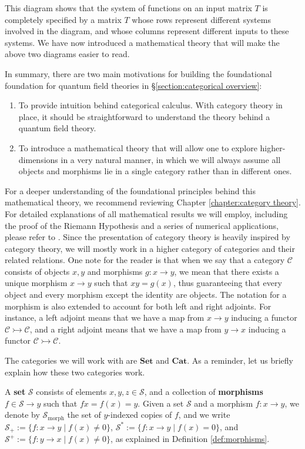 \documentclass[a4paper,reqno,oneside]{article}
\begin{document}
This diagram shows that the system of functions on an input matrix $T$ is completely specified by a matrix $T$ whose rows represent different systems involved in the diagram, and whose columns represent different inputs to these systems. We have now introduced a mathematical theory that will make the above two diagrams easier to read.

In summary, there are two main motivations for building the foundational foundation for quantum field theories in \S \ref{section:categorical overview}: 
\begin{enumerate}
    \item To provide intuition behind categorical calculus. With category theory in place, it should be straightforward to understand the theory behind a quantum field theory.  
    \item To introduce a mathematical theory that will allow one to explore higher-dimensions in a very natural manner, in which we will always assume all objects and morphisms lie in a single category rather than in different ones.
\end{enumerate} 
For a deeper understanding of the foundational principles behind this mathematical theory, we recommend reviewing Chapter \ref{chapter:category theory}. For detailed explanations of all mathematical results we will employ, including the proof of the Riemann Hypothesis and a series of numerical applications, please refer to \cite{MaxVazquez:2023}. Since the presentation of category theory is heavily inspired by category theory, we will mostly work in a higher category of categories and their related relations. One note for the reader is that when we say that a category $\mathcal{C}$ consists of objects $x, y$ and morphisms $g: x \to y$, we mean that there exists a unique morphism $x \to y$ such that $xy = g(x)$, thus guaranteeing that every object and every morphism except the identity are objects. The notation for a morphism is also extended to account for both left and right adjoints. For instance, a left adjoint means that we have a map from $x \to y$ inducing a functor $\mathcal{C} \rightarrowtail \mathcal{C}$, and a right adjoint means that we have a map from $y \to x$ inducing a functor $\mathcal{C} \rightarrowtail \mathcal{C}$. 

The categories we will work with are $\mathbf{Set}$ and $\mathbf{Cat}$. As a reminder, let us briefly explain how these two categories work. 
\begin{definition}[Set]
    A \textbf{set} $\mathcal{S}$ consists of elements $x, y, z \in \mathcal{S}$, and a collection of \textbf{morphisms} $f \in \mathcal{S} \to y$ such that $fx = f(x) = y$.
    Given a set $\mathcal{S}$ and a morphism $f : x \to y$, we denote by $\mathcal{S}_{\text{morph}}$ the set of $y$-indexed copies of $f$, and we write $\mathcal{S}_{+} := \{f : x \to y \mid f(x) \neq 0\}$, $\mathcal{S}^\ast := \{f : x \to y \mid f(x) = 0\}$, and $\mathcal{S}^+ := \{f : y \to x \mid f(x) \neq 0\}$, as explained in Definition \ref{def:morphisms}.
\end{definition} 
\end{document}
